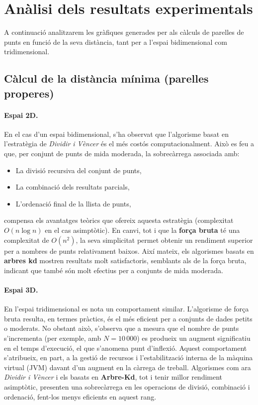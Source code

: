 \documentclass{ieeetj}
\begin{document}
\section*{Anàlisi dels resultats experimentals}

A continuació analitzarem les gràfiques generades per als càlculs de parelles de punts en funció de la seva distància, tant per a l'espai bidimensional com tridimensional.

\subsection*{Càlcul de la distància mínima (parelles properes)}

\paragraph{Espai 2D.}
En el cas d'un espai bidimensional, s'ha observat que l'algorisme basat en l'estratègia de \textit{Dividir i Vèncer} és el més costós computacionalment. Això es feu a que, per conjunt de punts de mida moderada, la sobrecàrrega associada amb:
\begin{itemize}
    \item La divisió recursiva del conjunt de punts,
    \item La combinació dels resultats parcials,
    \item L'ordenació final de la llista de punts,
\end{itemize}
compensa els avantatges teòrics que ofereix aquesta estratègia (complexitat \(O(n\log n)\) en el cas asimptòtic). En canvi, tot i que la \textbf{força bruta} té una complexitat de \(O(n^2)\), la seva simplicitat permet obtenir un rendiment superior per a nombres de punts relativament baixos. Així mateix, els algorismes basats en \textbf{arbres kd} mostren resultats molt satisfactoris, semblants als de la força bruta, indicant que també són molt efectius per a conjunts de mida moderada.

\paragraph{Espai 3D.}
En l'espai tridimensional es nota un comportament similar. L'algorisme de força bruta resulta, en termes pràctics, és el més eficient per a conjunts de dades petits o moderats. No obstant això, s'observa que a mesura que el nombre de punts s'incrementa (per exemple, amb \(N = 10\,000\)) es produeix un augment significatiu en el temps d'execució, el que s'anomena punt d'inflexió. Aquest comportament s'atribueix, en part, a la gestió de recursos i l'estabilització interna de la màquina virtual (JVM) davant d'un augment en la càrrega de treball. Algorismes com ara \textit{Dividir i Vèncer} i els basats en \textbf{Arbre-Kd}, tot i tenir millor rendiment asimptòtic, presenten una sobrecàrrega en les operacions de divisió, combinació i ordenació, fent-los menys eficients en aquest rang.
\end{document}
